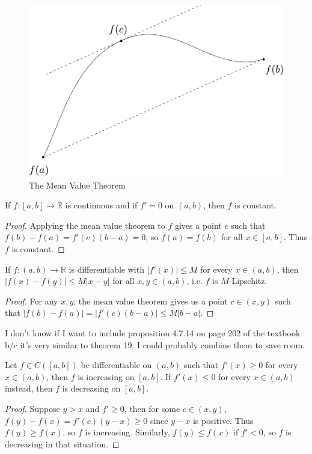 \documentclass[10pt]{report}
\begin{document}
\begin{figure}[H]
	\centering
	\includegraphics[scale=1]{fig/mean-value.pdf}
	\caption{The Mean Value Theorem}
\end{figure}


\begin{cor}
	\label{cor:der-constant}
	If $f:[a,b] \to \mathbb{R}$ is continuous and if $f'=0$ on $(a,b)$, then $f$ is constant.
\end{cor}
\begin{proof}
	Applying the mean value theorem to $f$ gives a point $c$ such that $f(b)-f(a) = f'(c)(b-a) = 0$, so $f(a) = f(b)$ for all $x \in [a,b]$. Thus $f$ is constant.
\end{proof}

\begin{cor}
	If $f:(a,b)\to\mathbb{R}$ is differentiable with $|f'(x)|\leq M$ for every $x \in (a,b)$, then $|f(x)-f(y)| \leq M |x-y|$ for all $x,y \in (a,b)$, i.e. $f$ is $M$-Lipschitz.
\end{cor}
\begin{proof}
	For any $x,y$, the mean value theorem gives us a point $c \in (x,y)$ such that $|f(b)-f(a)| = |f'(c) (b-a)| \leq M |b-a|$.
\end{proof}

{\color{red}I don't know if I want to include proposition 4.7.14 on page 202 of the textbook b/c it's very similar to theorem 19. I could probably combine them to save room.}

\begin{prop}
	Let $f \in C([a,b])$ be differentiable on $(a,b)$ such that $f'(x) \geq 0$ for every $x \in (a,b)$, then $f$ is increasing on $[a,b]$. If $f'(x) \leq 0$ for every $x \in(a,b)$ instead, then $f$ is decreasing on $[a,b]$.
\end{prop}
\begin{proof}
	Suppose $y>x$ and $f'\geq 0$, then for some $c \in (x,y)$, $f(y)-f(x) = f'(c) (y-x) \geq 0$ since $y-x$ is positive. Thus $f(y) \geq f(x)$, so $f$ is increasing. Similarly, $f(y) \leq f(x)$ if $f' < 0$, so $f$ is decreasing in that situation.
\end{proof}
\end{document}
